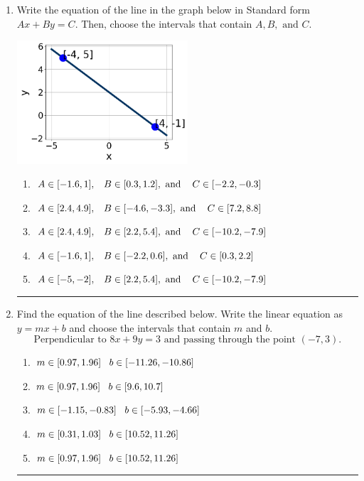 \documentclass[14pt]{extbook}
\newcommand{\litem}[1]{\item#1\hspace*{-1cm}\rule{\textwidth}{0.4pt}}
\begin{document}
\begin{enumerate}
{\begin{enumerate}[label=\Alph*.]
\end{enumerate} }
\litem{
Write the equation of the line in the graph below in Standard form $Ax+By=C$. Then, choose the intervals that contain $A, B, \text{ and } C$.
\begin{center}
    \includegraphics[width=0.5\textwidth]{../Figures/linearGraphToStandardCopyA.png}
\end{center}
\begin{enumerate}[label=\Alph*.]
\item \( A \in [-1.6, 1], \hspace{3mm} B \in [0.3, 1.2], \text{ and } \hspace{3mm} C \in [-2.2, -0.3] \)
\item \( A \in [2.4, 4.9], \hspace{3mm} B \in [-4.6, -3.3], \text{ and } \hspace{3mm} C \in [7.2, 8.8] \)
\item \( A \in [2.4, 4.9], \hspace{3mm} B \in [2.2, 5.4], \text{ and } \hspace{3mm} C \in [-10.2, -7.9] \)
\item \( A \in [-1.6, 1], \hspace{3mm} B \in [-2.2, 0.6], \text{ and } \hspace{3mm} C \in [0.3, 2.2] \)
\item \( A \in [-5, -2], \hspace{3mm} B \in [2.2, 5.4], \text{ and } \hspace{3mm} C \in [-10.2, -7.9] \)

\end{enumerate} }
\litem{
Find the equation of the line described below. Write the linear equation as $ y=mx+b $ and choose the intervals that contain $m$ and $b$.\[ \text{Perpendicular to } 8 x + 9 y = 3 \text{ and passing through the point } (-7, 3). \]\begin{enumerate}[label=\Alph*.]
\item \( m \in [0.97, 1.96] \hspace*{3mm} b \in [-11.26, -10.86] \)
\item \( m \in [0.97, 1.96] \hspace*{3mm} b \in [9.6, 10.7] \)
\item \( m \in [-1.15, -0.83] \hspace*{3mm} b \in [-5.93, -4.66] \)
\item \( m \in [0.31, 1.03] \hspace*{3mm} b \in [10.52, 11.26] \)
\item \( m \in [0.97, 1.96] \hspace*{3mm} b \in [10.52, 11.26] \)


\end{enumerate}}
\end{enumerate}
\end{document}
